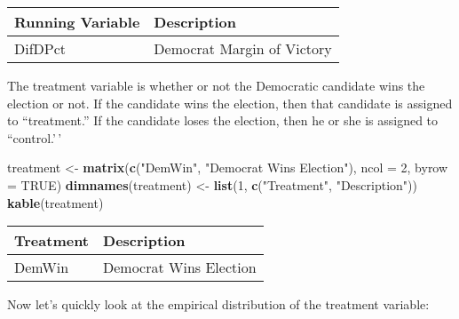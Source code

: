 \documentclass[
  12pt,
  leqno]{article}
\newenvironment{Shaded}{\begin{snugshade}}{\end{snugshade}}
\newcommand{\AttributeTok}[1]{\textcolor[rgb]{0.13,0.29,0.53}{#1}}
\newcommand{\ConstantTok}[1]{\textcolor[rgb]{0.56,0.35,0.01}{#1}}
\newcommand{\DecValTok}[1]{\textcolor[rgb]{0.00,0.00,0.81}{#1}}
\newcommand{\FunctionTok}[1]{\textcolor[rgb]{0.13,0.29,0.53}{\textbf{#1}}}
\newcommand{\NormalTok}[1]{#1}
\newcommand{\OtherTok}[1]{\textcolor[rgb]{0.56,0.35,0.01}{#1}}
\newcommand{\SpecialCharTok}[1]{\textcolor[rgb]{0.81,0.36,0.00}{\textbf{#1}}}
\newcommand{\StringTok}[1]{\textcolor[rgb]{0.31,0.60,0.02}{#1}}
\begin{document}
\begin{longtable}[]{@{}ll@{}}
\toprule\noalign{}
Running Variable & Description \\
\midrule\noalign{}
\endhead
\bottomrule\noalign{}
\endlastfoot
DifDPct & Democrat Margin of Victory \\
\end{longtable}

\normalsize

The treatment variable is whether or not the Democratic candidate wins
the election or not. If the candidate wins the election, then that
candidate is assigned to ``treatment.'' If the candidate loses the
election, then he or she is assigned to ``control.'\,'

\scriptsize

\begin{Shaded}
\begin{Highlighting}[]
\NormalTok{treatment }\OtherTok{\textless{}{-}} \FunctionTok{matrix}\NormalTok{(}\FunctionTok{c}\NormalTok{(}\StringTok{"DemWin"}\NormalTok{, }\StringTok{"Democrat Wins Election"}\NormalTok{), }\AttributeTok{ncol =} \DecValTok{2}\NormalTok{, }\AttributeTok{byrow =} \ConstantTok{TRUE}\NormalTok{)}
\FunctionTok{dimnames}\NormalTok{(treatment) }\OtherTok{\textless{}{-}} \FunctionTok{list}\NormalTok{(}\DecValTok{1}\NormalTok{, }\FunctionTok{c}\NormalTok{(}\StringTok{"Treatment"}\NormalTok{, }\StringTok{"Description"}\NormalTok{))}
\FunctionTok{kable}\NormalTok{(treatment)}
\end{Highlighting}
\end{Shaded}

\begin{longtable}[]{@{}ll@{}}
\toprule\noalign{}
Treatment & Description \\
\midrule\noalign{}
\endhead
\bottomrule\noalign{}
\endlastfoot
DemWin & Democrat Wins Election \\
\end{longtable}

\normalsize

Now let's quickly look at the empirical distribution of the treatment
variable:

\scriptsize

\begin{Shaded}
\end{Shaded}
\end{document}
